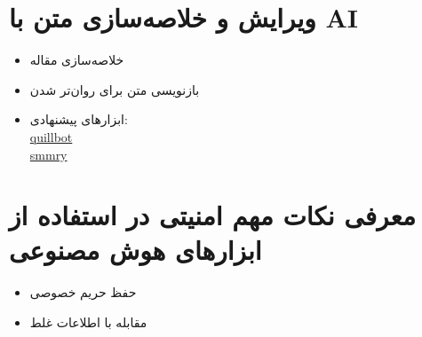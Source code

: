 \section{ویرایش و خلاصه‌سازی متن با AI}
\begin{itemize}
\item
خلاصه‌سازی مقاله
\item
بازنویسی متن برای روان‌تر شدن
\item
ابزارهای پیشنهادی:\\
\href{https://quillbot.com/}{quillbot}\\
\href{https://smmry.com/}{smmry}\\
\end{itemize}

\section{معرفی نکات مهم امنیتی در استفاده از ابزارهای هوش مصنوعی}
\begin{itemize}
\item
حفظ حریم خصوصی
\item
مقابله با اطلاعات غلط
\end{itemize}